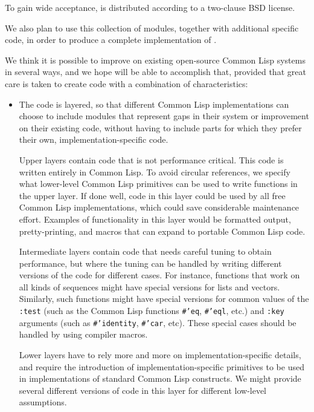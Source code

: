 To gain wide acceptance, \sysname{} is distributed according to a
two-clause BSD license.

We also plan to use this collection of modules, together with
additional specific code, in order to produce a complete
implementation of \commonlisp{}.

We think it is possible to improve on existing open-source Common Lisp
systems in several ways, and we hope \sysname{} will be able to
accomplish that, provided that great care is taken to create code with
a combination of characteristics:

\begin{itemize}
\item The code is layered, so that different Common Lisp
  implementations can choose to include \sysname{} modules that
  represent gaps in their system or improvement on their existing
  code, without having to include parts for which they prefer their
  own, implementation-specific code. 

  Upper layers contain code that is not performance critical.  This
  code is written entirely in Common Lisp.  To avoid circular
  references, we specify what lower-level Common Lisp primitives can
  be used to write functions in the upper layer.  If done well, code
  in this layer could be used by all free Common Lisp implementations,
  which could save considerable maintenance effort.  Examples of
  functionality in this layer would be formatted output,
  pretty-printing, and macros that can expand to portable Common Lisp
  code.

  Intermediate layers contain code that needs careful tuning to
  obtain performance, but where the tuning can be handled by writing
  different versions of the code for different cases.  For instance,
  functions that work on all kinds of sequences might have special
  versions for lists and vectors.  Similarly, such functions might
  have special versions for common values of the \texttt{:test} (such
  as the Common Lisp functions \texttt{\#'eq}, \texttt{\#'eql}, etc.)
  and \texttt{:key} arguments (such as \texttt{\#'identity},
  \texttt{\#'car}, etc).  These special cases should be handled by
  using compiler macros.

  Lower layers have to rely more and more on implementation-specific
  details, and require the introduction of implementation-specific
  primitives to be used in implementations of standard Common Lisp
  constructs.  We might provide several different versions of code in
  this layer for different low-level assumptions.


\end{itemize}
